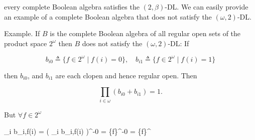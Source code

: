 every complete Boolean algebra satisfies the $(2, \beta)$-DL. We can easily provide an example of a complete Boolean algebra that does not satisfy the $(\omega, 2)$-DL.

Example. If $B$ is the complete Boolean algebra of all regular open sets of the product space $2^\omega$ then $B$ does not satisfy the $(\omega, 2)$-DL: If

$$b_{i0} \triangleq \{f \in 2^\omega \mid f(i) = 0\}, \quad b_{i1} \triangleq \{f \in 2^\omega \mid f(i) = 1\}$$

then $b_{i0}$, and $b_{i1}$ are each clopen and hence regular open. Then

$$\prod_{i \in \omega} (b_{i0} + b_{i1}) = 1.$$

But $\forall f \in 2^\omega$

$$\prod_{i \in \omega} b_{i,f(i)} = \left( \bigcap_{i \in \omega} b_{i,f(i)} \right)^{-0} = \{f\}^{-0} = \{f\}^
